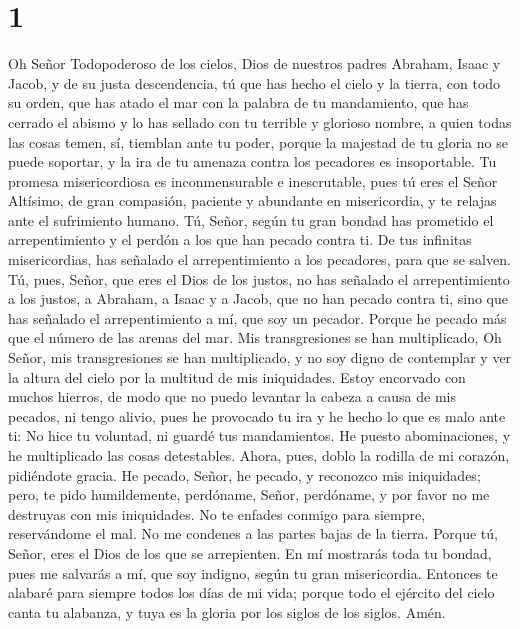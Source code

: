 \hypertarget{section}{%
\section{1}\label{section}}

 Oh Señor Todopoderoso de los cielos, Dios de nuestros
padres Abraham, Isaac y Jacob, y de su justa descendencia,
 tú que has hecho el cielo y la tierra, con todo su orden,
 que has atado el mar con la palabra de tu mandamiento,
que has cerrado el abismo y lo has sellado con tu terrible y glorioso
nombre,  a quien todas las cosas temen, sí, tiemblan ante
tu poder,  porque la majestad de tu gloria no se puede
soportar, y la ira de tu amenaza contra los pecadores es insoportable.
 Tu promesa misericordiosa es inconmensurable e
inescrutable,  pues tú eres el Señor Altísimo, de gran
compasión, paciente y abundante en misericordia, y te relajas ante el
sufrimiento humano.  Tú, Señor, según tu gran bondad has
prometido el arrepentimiento y el perdón a los que han pecado contra ti.
De tus infinitas misericordias, has señalado el arrepentimiento a los
pecadores, para que se salven. Tú, pues, Señor, que eres el Dios de los
justos, no has señalado el arrepentimiento a los justos, a Abraham, a
Isaac y a Jacob, que no han pecado contra ti, sino que has señalado el
arrepentimiento a mí, que soy un pecador.  Porque he
pecado más que el número de las arenas del mar. Mis transgresiones se
han multiplicado, Oh Señor, mis transgresiones se han multiplicado, y no
soy digno de contemplar y ver la altura del cielo por la multitud de mis
iniquidades.  Estoy encorvado con muchos hierros, de modo
que no puedo levantar la cabeza a causa de mis pecados, ni tengo alivio,
pues he provocado tu ira y he hecho lo que es malo ante ti: No hice tu
voluntad, ni guardé tus mandamientos. He puesto abominaciones, y he
multiplicado las cosas detestables.  Ahora, pues, doblo
la rodilla de mi corazón, pidiéndote gracia.  He pecado,
Señor, he pecado, y reconozco mis iniquidades;  pero, te
pido humildemente, perdóname, Señor, perdóname, y por favor no me
destruyas con mis iniquidades. No te enfades conmigo para siempre,
reservándome el mal. No me condenes a las partes bajas de la tierra.
Porque tú, Señor, eres el Dios de los que se arrepienten.
 En mí mostrarás toda tu bondad, pues me salvarás a mí,
que soy indigno, según tu gran misericordia.  Entonces te
alabaré para siempre todos los días de mi vida; porque todo el ejército
del cielo canta tu alabanza, y tuya es la gloria por los siglos de los
siglos. Amén.
